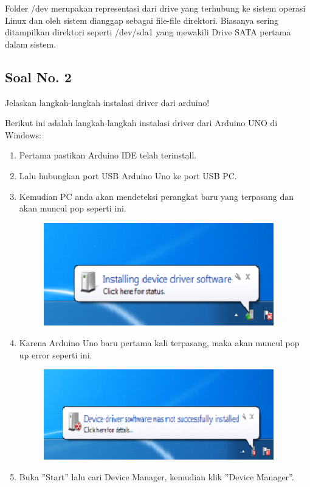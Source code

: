 \hfill \break
Folder /dev merupakan representasi dari drive yang terhubung ke sistem operasi Linux dan oleh sistem dianggap sebagai file-file direktori. Biasanya sering ditampilkan direktori seperti /dev/sda1 yang mewakili Drive SATA pertama dalam sistem.

\subsection{Soal No. 2}
Jelaskan langkah-langkah instalasi driver dari arduino!

\hfill \break
Berikut ini adalah langkah-langkah instalasi driver dari Arduino UNO di Windows:

\begin{enumerate}
	\item Pertama pastikan Arduino IDE telah terinstall.
	\item Lalu hubungkan port USB Arduino Uno ke port USB PC.
	\item Kemudian PC anda akan mendeteksi perangkat baru yang terpasang dan akan muncul pop seperti ini.
	\begin{figure}[H]
		\includegraphics[width=10cm]{figures/5/1174086/Teori/1.png}
		\centering
	\end{figure}
	\item Karena Arduino Uno baru pertama kali terpasang, maka akan muncul pop up error seperti ini.
	\begin{figure}[H]
		\includegraphics[width=10cm]{figures/5/1174086/Teori/2.png}
		\centering
	\end{figure}
	\item Buka ''Start'' lalu cari Device Manager, kemudian klik ''Device Manager''.

\end{enumerate}
